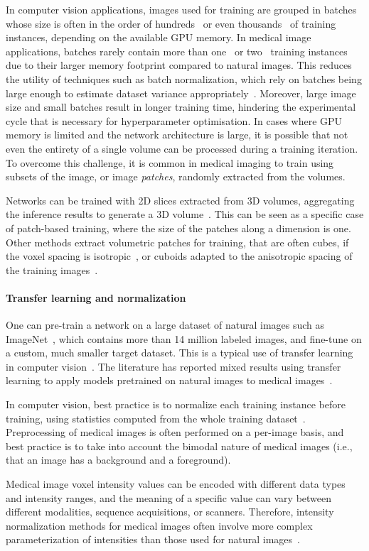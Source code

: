 In computer vision applications, images used for training are grouped in batches whose size is often in the order of hundreds~\cite{krizhevsky_imagenet_2012} or even thousands~\cite{chen_simple_2020} of training instances, depending on the available \ac{GPU} memory.
In medical image applications, batches rarely contain more than one~\cite{cicek_3d_2016} or two~\cite{milletari_v-net_2016} training instances due to their larger memory footprint compared to natural images.
This reduces the utility of techniques such as batch normalization, which rely on batches being large enough to estimate dataset variance appropriately~\cite{ioffe_batch_2015}.
Moreover, large image size and small batches result in longer training time, hindering the experimental cycle that is necessary for hyperparameter optimisation.
In cases where \ac{GPU} memory is limited and the network architecture is large, it is possible that not even the entirety of a single volume can be processed during a training iteration.
To overcome this challenge, it is common in medical imaging to train using subsets of the image, or image \textit{patches}, randomly extracted from the volumes.

Networks can be trained with 2D slices extracted from 3D volumes, aggregating the inference results to generate a 3D volume~\cite{lucena_convolutional_2019}.
This can be seen as a specific case of patch-based training, where the size of the patches along a dimension is one.
Other methods extract volumetric patches for training, that are often cubes, if the voxel spacing is isotropic~\cite{li_compactness_2017}, or cuboids adapted to the anisotropic spacing of the training images~\cite{nikolov_deep_2018}.


\paragraph{Transfer learning and normalization}

One can pre-train a network on a large dataset of natural images such as ImageNet~\cite{deng_imagenet_2009}, which contains more than 14 million labeled images, and fine-tune on a custom, much smaller target dataset.
This is a typical use of transfer learning in computer vision~\cite{weiss_survey_2016}.
The literature has reported mixed results using transfer learning to apply models pretrained on natural images to medical images~\cite{cheplygina_cats_2019,raghu_transfusion_2019}.

In computer vision, best practice is to normalize each training instance before training, using statistics computed from the whole training dataset~\cite{krizhevsky_imagenet_2012}.
Preprocessing of medical images is often performed on a per-image basis, and best practice is to take into account the bimodal nature of medical images (i.e., that an image has a background and a foreground).

Medical image voxel intensity values can be encoded with different data types and intensity ranges, and the meaning of a specific value can vary between different modalities, sequence acquisitions, or scanners.
Therefore, intensity normalization methods for medical images often involve more complex parameterization of intensities than those used for natural images~\cite{nyul_standardizing_1999}.
